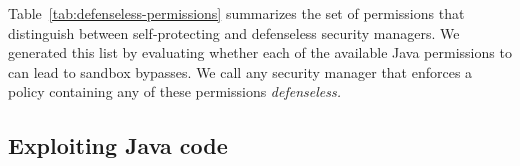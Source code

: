 \documentclass{sig-alternate}
\begin{document}
Table~\ref{tab:defenseless-permissions} summarizes the set of permissions
that distinguish between self-protecting and defenseless security
managers. We generated this list by evaluating whether each of the available Java permissions to
can lead to sandbox bypasses. We
call any security manager that enforces a policy 
containing any of these permissions \emph{defenseless.}

\subsection{Exploiting Java code}
\label{sec:javaexploits}

\end{document}
